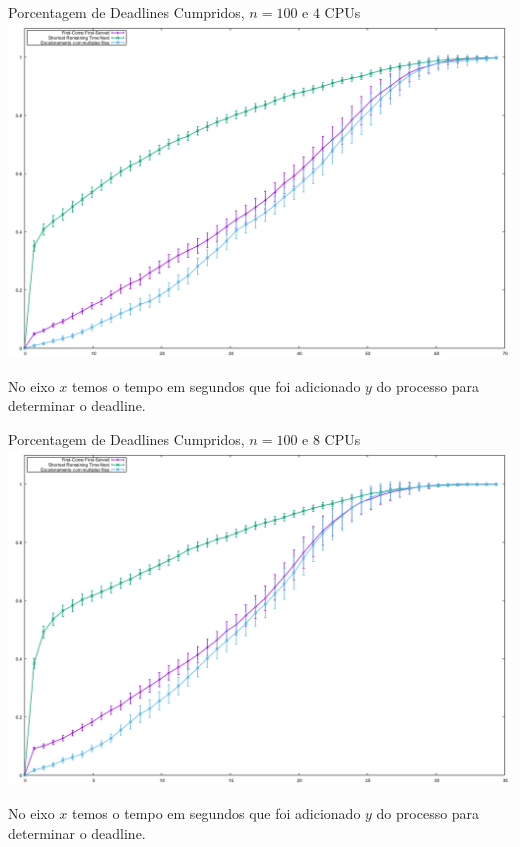 \documentclass{beamer}
\begin{document}
\begin{frame}{Porcentagem de Deadlines Cumpridos, $n = 100$ e $4$ CPUs}
	\includegraphics[width=\textwidth]{graphs/testes_capella/result/deadlines-r4-100}
	
	{\tiny No eixo $x$ temos o tempo em segundos que foi adicionado $y$ do processo para determinar o deadline.}
\end{frame}


\begin{frame}{Porcentagem de Deadlines Cumpridos, $n = 100$ e $8$ CPUs}
	\includegraphics[width=\textwidth]{graphs/testes_capella/result/deadlines-r8-100}
	
	{\tiny No eixo $x$ temos o tempo em segundos que foi adicionado $y$ do processo para determinar o deadline.}
\end{frame}
\end{document}
